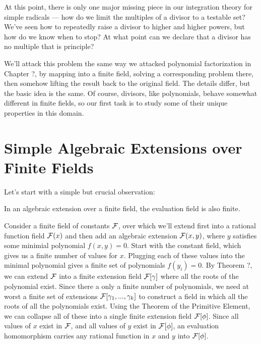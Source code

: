 

At this point, there is only one major missing piece in our
integration theory for simple radicals --- how do we limit the
multiples of a divisor to a testable set?  We've seen how to
repeatedly raise a divisor to higher and higher powers, but how do we
know when to stop?  At what point can we declare that a divisor has no
multiple that is principle?

We'll attack this problem the same way we attacked polynomial
factorization in Chapter ?, by mapping into a finite field, solving a
corresponding problem there, then somehow lifting the result back to
the original field.  The details differ, but the basic idea is the
same.  Of course, divisors, like polynomials, behave somewhat
different in finite fields, so our first task is to study
some of their unique properties in this domain.

\section{Simple Algebraic Extensions over Finite Fields}

Let's start with a simple but crucial observation:

\theorem

In an algebraic extension over a finite field, the evaluation field is
also finite.

\proof

Consider a finite field of constants ${\cal F}$, over which we'll
extend first into a rational function field ${\cal F}(x)$ and then add
an algebraic extension ${\cal F}(x,y)$, where $y$ satisfies some
minimial polynomial $f(x,y)=0$.  Start with the constant field, which
gives us a finite number of values for $x$.  Plugging each of these
values into the minimal polynomial gives a finite set of polynomials
$f(y_i)=0$.  By Theorem ?, we can extend ${\cal F}$ into a finite
extension field ${\cal F}[\gamma]$ where all the roots of the
polynomial exist.  Since there a only a finite number of polynomials,
we need at worst a finite set of extensions ${\cal
F}[\gamma_1,...,\gamma_k]$ to construct a field in which all the roots
of all the polynomials exist.  Using the Theorem of the Primitive
Element, we can collapse all of these into a single finite extension
field ${\cal F}[\phi]$.  Since all values of $x$ exist in ${\cal F}$,
and all values of $y$ exist in ${\cal F}[\phi]$, an evaluation
homomorphism carries any rational function in $x$ and $y$ into
${\cal F}[\phi]$.


